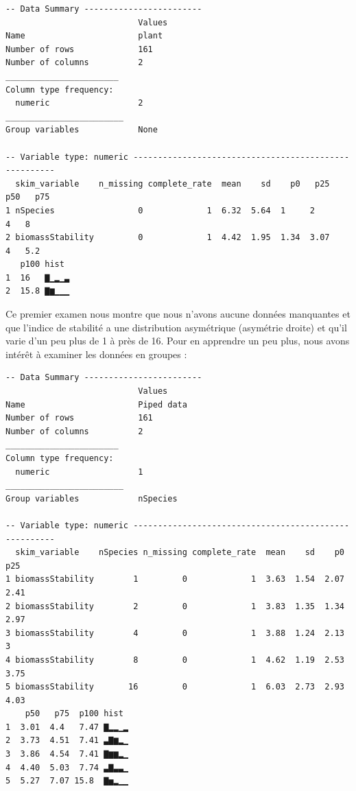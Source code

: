 \documentclass[
  a4paper,
]{article}
\newenvironment{Shaded}{\begin{snugshade}}{\end{snugshade}}
\newcommand{\KeywordTok}[1]{\textcolor[rgb]{0.12,0.11,0.11}{\textbf{#1}}}
\newcommand{\NormalTok}[1]{\textcolor[rgb]{0.12,0.11,0.11}{#1}}
\newcommand{\OperatorTok}[1]{\textcolor[rgb]{0.12,0.11,0.11}{#1}}
\newcommand{\StringTok}[1]{\textcolor[rgb]{0.75,0.01,0.01}{#1}}
\begin{document}
\begin{verbatim}
-- Data Summary ------------------------
                           Values
Name                       plant 
Number of rows             161   
Number of columns          2     
_______________________          
Column type frequency:           
  numeric                  2     
________________________         
Group variables            None  

-- Variable type: numeric ------------------------------------------------------
  skim_variable    n_missing complete_rate  mean    sd    p0   p25   p50   p75
1 nSpecies                 0             1  6.32  5.64  1     2        4   8  
2 biomassStability         0             1  4.42  1.95  1.34  3.07     4   5.2
   p100 hist 
1  16   ▇▁▂▁▃
2  15.8 ▇▆▁▁▁
\end{verbatim}

Ce premier examen nous montre que nous n'avons aucune données manquantes et que l'indice de stabilité a une distribution asymétrique (asymétrie droite) et qu'il varie d'un peu plus de 1 à près de 16. Pour en apprendre un peu plus, nous avons intérêt à examiner les données en groupes :

\begin{Shaded}
\end{Shaded}

\begin{verbatim}
-- Data Summary ------------------------
                           Values    
Name                       Piped data
Number of rows             161       
Number of columns          2         
_______________________              
Column type frequency:               
  numeric                  1         
________________________             
Group variables            nSpecies  

-- Variable type: numeric ------------------------------------------------------
  skim_variable    nSpecies n_missing complete_rate  mean    sd    p0   p25
1 biomassStability        1         0             1  3.63  1.54  2.07  2.41
2 biomassStability        2         0             1  3.83  1.35  1.34  2.97
3 biomassStability        4         0             1  3.88  1.24  2.13  3   
4 biomassStability        8         0             1  4.62  1.19  2.53  3.75
5 biomassStability       16         0             1  6.03  2.73  2.93  4.03
    p50   p75  p100 hist 
1  3.01  4.4   7.47 ▇▂▂▁▂
2  3.73  4.51  7.41 ▃▇▆▂▁
3  3.86  4.54  7.41 ▇▆▆▂▁
4  4.40  5.03  7.74 ▃▇▃▃▁
5  5.27  7.07 15.8  ▇▅▂▁▁
\end{verbatim}
\end{document}
